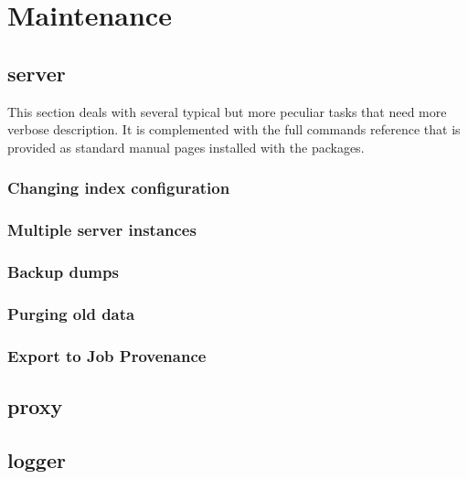\section{Maintenance}

\subsection{\LB server}

This section deals with several typical but more peculiar tasks
that need more verbose description.
It is complemented with the full commands reference that is provided
as standard manual pages installed with the \LB packages.

\subsubsection{Changing index configuration}


\subsubsection{Multiple server instances}

\subsubsection{Backup dumps}

\subsubsection{Purging old data}


\subsubsection{Export to Job Provenance}


\subsection{\LB proxy}

\subsection{\LB logger}
